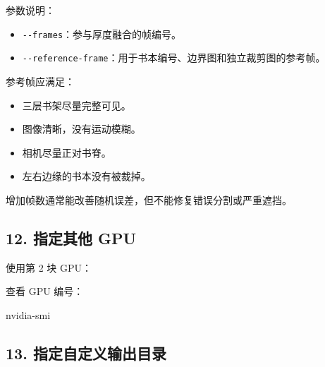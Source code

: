 \documentclass[
  chinese,
  11pt,
  a4paper,
]{article}
\newenvironment{Shaded}{\begin{snugshade}}{\end{snugshade}}
\newcommand{\AttributeTok}[1]{\textcolor[rgb]{0.13,0.29,0.53}{#1}}
\newcommand{\DataTypeTok}[1]{\textcolor[rgb]{0.13,0.29,0.53}{#1}}
\newcommand{\ExtensionTok}[1]{#1}
\newcommand{\NormalTok}[1]{#1}
\newcommand{\OperatorTok}[1]{\textcolor[rgb]{0.81,0.36,0.00}{\textbf{#1}}}
\newcommand{\StringTok}[1]{\textcolor[rgb]{0.31,0.60,0.02}{#1}}
\newcommand{\VariableTok}[1]{\textcolor[rgb]{0.00,0.00,0.00}{#1}}
\providecommand{\tightlist}{%
  \setlength{\itemsep}{0pt}\setlength{\parskip}{0pt}}
\begin{document}
参数说明：

\begin{itemize}
\tightlist
\item
  \texttt{-\/-frames}：参与厚度融合的帧编号。
\item
  \texttt{-\/-reference-frame}：用于书本编号、边界图和独立裁剪图的参考帧。
\end{itemize}

参考帧应满足：

\begin{itemize}
\tightlist
\item
  三层书架尽量完整可见。
\item
  图像清晰，没有运动模糊。
\item
  相机尽量正对书脊。
\item
  左右边缘的书本没有被裁掉。
\end{itemize}

增加帧数通常能改善随机误差，但不能修复错误分割或严重遮挡。

\subsection{12. 指定其他 GPU}\label{12-ux6307ux5b9aux5176ux4ed6-gpu}

使用第 2 块 GPU：

\begin{Shaded}
\end{Shaded}

查看 GPU 编号：

\begin{Shaded}
\begin{Highlighting}[]
\ExtensionTok{nvidia{-}smi}
\end{Highlighting}
\end{Shaded}

\subsection{13.
指定自定义输出目录}\label{13-ux6307ux5b9aux81eaux5b9aux4e49ux8f93ux51faux76eeux5f55}

\begin{Shaded}
\end{Shaded}
\end{document}
